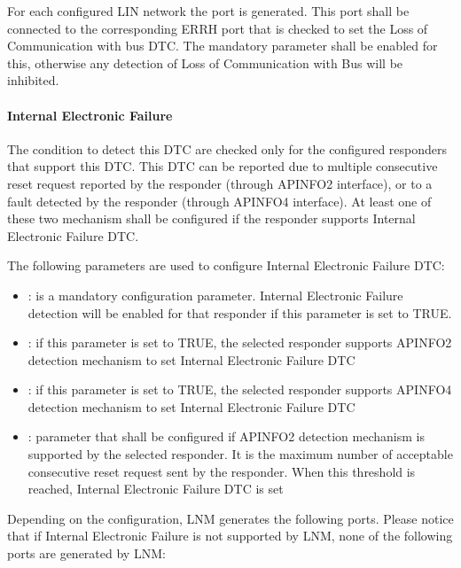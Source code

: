 For each configured LIN network the port  is generated. This port shall be connected to the corresponding ERRH port that is checked to set the Loss of Communication with bus DTC. The mandatory parameter  shall be enabled for this, otherwise any detection of Loss of Communication with Bus will be inhibited.

\paragraph{Internal Electronic Failure}
\label{sec:IEF}
The condition to detect this DTC are checked only for the configured responders that support this DTC. This DTC can be reported due to multiple consecutive reset request reported by the responder (through APINFO2 interface), or to a fault detected by the responder (through APINFO4 interface). At least one of these two mechanism shall be configured if the responder supports Internal Electronic Failure DTC.


The following parameters are used to configure Internal Electronic Failure DTC:

\begin{itemize}
\item {}: is a mandatory configuration parameter. Internal Electronic Failure detection will be enabled for that responder if this parameter is set to TRUE.
\item {}: if this parameter is set to TRUE, the selected responder supports APINFO2 detection mechanism to set Internal Electronic Failure DTC
\item {}: if this parameter is set to TRUE, the selected responder supports APINFO4 detection mechanism to set Internal Electronic Failure DTC
\item {}: parameter that shall be configured if APINFO2 detection mechanism is supported by the selected responder. It is the maximum number of acceptable consecutive reset request sent by the responder. When this threshold is reached, Internal Electronic Failure DTC is set
\end{itemize}


Depending on the configuration, LNM generates the following ports. Please notice that if Internal Electronic Failure is not supported by LNM, none of the following ports are generated by LNM:

